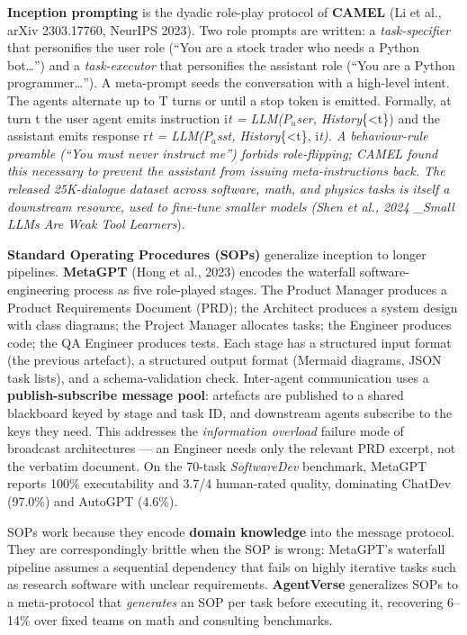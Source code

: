 \textbf{Inception prompting} is the dyadic role-play protocol of \textbf{CAMEL} (Li et al., arXiv 2303.17760, NeurIPS 2023). Two role prompts are written: a \emph{task-specifier} that personifies the user role (``You are a stock trader who needs a Python bot\ldots{}'') and a \emph{task-executor} that personifies the assistant role (``You are a Python programmer\ldots{}''). A meta-prompt seeds the conversation with a high-level intent. The agents alternate up to T turns or until a stop token is emitted. Formally, at turn t the user agent emits instruction i\emph{t = LLM(\(P_u\)ser, History}\{\textless t\}) and the assistant emits response r\emph{t = LLM(\(P_a\)sst, History}\{\textless t\}, i\emph{t). A behaviour-rule preamble (``You must never instruct me'') forbids role-flipping; CAMEL found this necessary to prevent the assistant from issuing meta-instructions back. The released 25K-dialogue dataset across software, math, and physics tasks is itself a downstream resource, used to fine-tune smaller models (Shen et al., 2024 \_Small LLMs Are Weak Tool Learners}).

\textbf{Standard Operating Procedures (SOPs)} generalize inception to longer pipelines. \textbf{MetaGPT} (Hong et al., 2023) encodes the waterfall software-engineering process as five role-played stages. The Product Manager produces a Product Requirements Document (PRD); the Architect produces a system design with class diagrams; the Project Manager allocates tasks; the Engineer produces code; the QA Engineer produces tests. Each stage has a structured input format (the previous artefact), a structured output format (Mermaid diagrams, JSON task lists), and a schema-validation check. Inter-agent communication uses a \textbf{publish-subscribe message pool}: artefacts are published to a shared blackboard keyed by stage and task ID, and downstream agents subscribe to the keys they need. This addresses the \emph{information overload} failure mode of broadcast architectures --- an Engineer needs only the relevant PRD excerpt, not the verbatim document. On the 70-task \emph{SoftwareDev} benchmark, MetaGPT reports 100\% executability and 3.7/4 human-rated quality, dominating ChatDev (97.0\%) and AutoGPT (4.6\%).

SOPs work because they encode \textbf{domain knowledge} into the message protocol. They are correspondingly brittle when the SOP is wrong: MetaGPT's waterfall pipeline assumes a sequential dependency that fails on highly iterative tasks such as research software with unclear requirements. \textbf{AgentVerse} generalizes SOPs to a meta-protocol that \emph{generates} an SOP per task before executing it, recovering 6--14\% over fixed teams on math and consulting benchmarks.

